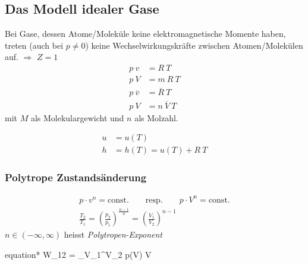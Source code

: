 	\subsection{Das Modell idealer Gase} %
		Bei Gase, dessen Atome/Moleküle keine elektromagnetische Momente haben, treten (auch bei $p \neq 0$) keine Wechselwirkungskräfte zwischen Atomen/Molekülen auf. $\Rightarrow$ $Z = 1$
		\begin{align*}
			p \: v &= R \: T \\
			p \: V &= m \: R \: T \\
			p \: \overline{v} &= \overline{R} \: T \\
			p \: V &= n \: \overline{V} \: T
		\end{align*}
		mit $M$ als Molekulargewicht und $n$ als Molzahl.
		
		\begin{align*}
			u &= u(T) \\
			h &= h(T) = u(T) + R\:T
		\end{align*}
		
		\subsubsection{Polytrope Zustandsänderung} %
			\label{subs:polytrope_zustandsaenderung}
			\begin{gather*}
				p\cdot v^n = \text{const.} \qquad \text{resp.} \qquad p\cdot V^n = \text{const.} \\
				\frac{T_2}{T_1} = \left( \frac{p_2}{p_1} \right)^{\frac{n-1}{n}} = \left( \frac{V_1}{V_2} \right)^{n-1}
			\end{gather*}
			$n \in (-\infty,\infty)$ heisst \emph{Polytropen-Exponent}
			
			\begin{empheq}[box=\shadowbox*]{equation*}
				W_{12} = \int_{V_1}^{V_2} p(V) \diff V
			\end{empheq}
			
			
			
